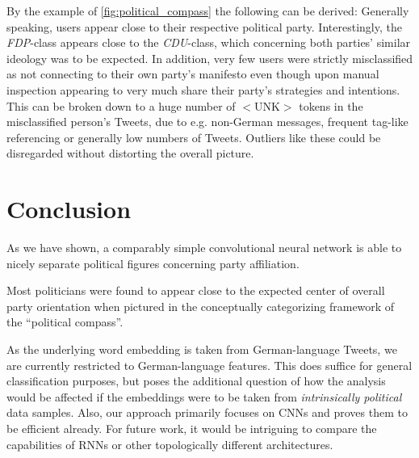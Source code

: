 \documentclass[10pt, oneside]{article}
\begin{document}
\begin{multicols}{2}

By the example of \autoref{fig:political_compass} the following can be derived: Generally speaking, users appear close to their respective political party. Interestingly, the \emph{FDP}-class appears close to the \emph{CDU}-class, which concerning both parties' similar ideology was to be expected. In addition, very few users were strictly misclassified as not connecting to their own party's manifesto even though upon manual inspection appearing to very much share their party's strategies and intentions. This can be broken down to a huge number of $<$UNK$>$ tokens in the misclassified person's Tweets, due to e.g. non-German messages, frequent tag-like referencing or generally low numbers of Tweets. Outliers like these could be disregarded without distorting the overall picture.


\section{Conclusion}

As we have shown, a comparably simple convolutional neural network is able to nicely separate political figures concerning party affiliation.

Most politicians were found to appear close to the expected center of overall party orientation when pictured in the conceptually categorizing framework of the ``political compass''.

As the underlying word embedding is taken from German-language Tweets, we are currently restricted to German-language features. This does suffice for general classification purposes, but poses the additional question of how the analysis would be affected if the embeddings were to be taken from \emph{intrinsically political} data samples. 
Also, our approach primarily focuses on CNNs and proves them to be efficient already. For future work, it would be intriguing to compare the capabilities of RNNs or other topologically different architectures. 

\end{multicols}

\newpage



\end{document}
